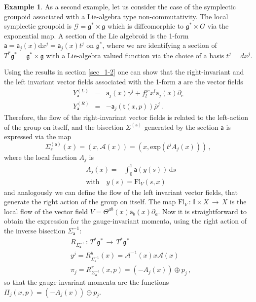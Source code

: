 \documentclass[12pt,a4paper]{article}
\numberwithin{equation}{section}
\theoremstyle{definition}
\newtheorem{example}[equation]{Example}
\newcommand{\cG}{\mathcal{G}}
\newcommand{\fg}{\mathfrak{g}}
\newcommand{\fgs}{\mathfrak{g}^\ast}
\newcommand{\dd}{\mathrm{d}}
\newcommand{\sft}{\mathsf{t}}
\newcommand{\sfa}{\mathsf{a}}
\newcommand{\be}{\begin{equation}}
\newcommand{\ee}{\end{equation}}
\newcommand{\bea}{\begin{eqnarray}}
\newcommand{\eea}{\end{eqnarray}}
\begin{document}
\begin{example}
As a second example, let us consider the case of the symplectic groupoid associated with a Lie-algebra type non-commutativity. The local symplectic groupoid is $\cG = \fgs \times \fg$ which is diffeomorphic to  $\fgs \times G$ via the exponential map. A section of the Lie algebroid is the 1-form ${\sfa} ={\sfa}_j(x)\dd x^j = {\sfa}_j(x) t^j$ on $\fgs$, where we are identifying a section of $T^{\ast}\fgs = \fgs \times \fg$ with a Lie-algebra valued function via the choice of a basis $t^j = dx^j$. 

Using the results in section \ref{sec_1-2} one can show that the right-invariant and the left invariant vector fields associated with the 1-form ${\sfa}$ are the vector fields
\bea
Y^{(L)}_{\sfa} &=& {\sfa}_j(x){\gamma}^j + f_l^{jc} x^l {\sfa}_j(x) \partial_c \\
Y^{(R)}_{\sfa} &=& -{\sfa}_j(\sft(x,p))\overline{\rho}^j\,.
\eea
Therefore, the flow of {the right-invariant vector fields is related to the left-action} of the group on itself, and the bisection $\Sigma^{(\sfa)}$ generated by the section $\sfa$ is expressed via the map 
\be
\Sigma_{s}^{(\sfa)}(x) = (x, \mathcal{A}(x)) = (x, \mathrm{exp}(t^j A_j(x)))\,,
\ee
where the local function $A_j$ is 
\be
\begin{split}
& A_j(x)= -\int_0^1 {\sfa}(y(s)) \,\dd s  \\
& \mathrm{with}\quad y(s) = \mathrm{Fl}_V(s,x)\,
\end{split}
\ee
{
and analogously we can define the flow of the left invariant vector fields, that generate the right action of the group on itself.}
The map $\mathrm{Fl}_V\,\colon\,\mathbb{I} \times X\,\rightarrow\, X$ is the local flow of the vector field $V = \Theta^{ab}(x){\sfa}_{b}(x)\partial_a$. Now it is straightforward to obtain the expression for the gauge-invariant momenta, using the right action of the inverse bisection $\Sigma_{\sfa}^{-1}$:
\bea
& R_{\Sigma_{\sfa}^{-1}}\,\colon\,T^{\ast}\fgs \,\rightarrow\,T^{\ast}\fgs\\
& y^j = R_{\Sigma_{\sfa}^{-1}}^{y}(x) = \mathcal{A}^{-1}(x)x\mathcal{A}(x) \\
& \pi_j = R_{\Sigma_{\sfa}^{-1}}^{\pi} (x,p) = (-A_j(x))\oplus p_j\,,
\eea
so that the gauge invariant momenta are the functions $\Pi_j(x,p) = (-A_j(x)) \oplus p_j$.
\end{example}
\end{document}
